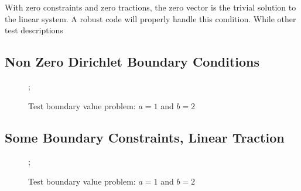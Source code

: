 \documentclass{article}
\begin{document}
With zero constraints and zero tractions, the zero vector is the trivial solution to the linear system. A robust code will properly handle this condition. While other test descriptions 

\FloatBarrier
\subsection{Non Zero Dirichlet Boundary Conditions}
\FloatBarrier

\begin{figure}
    ;
    \caption{Test boundary value problem: $a = 1$ and $b = 2$}
\centering
\end{figure}

\FloatBarrier
\subsection{Some Boundary Constraints, Linear Traction}
\FloatBarrier

\begin{figure}
    ;
    \caption{Test boundary value problem: $a = 1$ and $b = 2$}
\centering
\end{figure}
\end{document}
